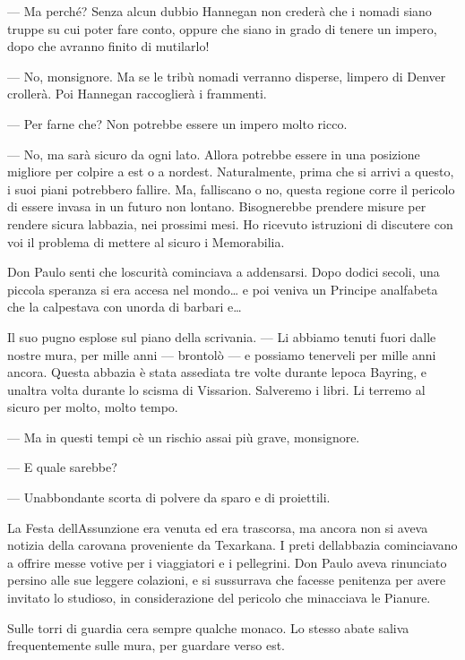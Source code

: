 --- Ma perché? Senza alcun dubbio Hannegan non crederà che i nomadi
siano truppe su cui poter fare conto, oppure che siano in grado di
tenere un impero, dopo che avranno finito di mutilarlo!

--- No, monsignore. Ma se le tribù nomadi verranno disperse,
l\textquotesingle impero di Denver crollerà. Poi Hannegan raccoglierà i
frammenti.

--- Per farne che? Non potrebbe essere un impero molto ricco.

--- No, ma sarà sicuro da ogni lato. Allora potrebbe essere in una
posizione migliore per colpire a est o a nordest. Naturalmente, prima
che si arrivi a questo, i suoi piani potrebbero fallire. Ma, falliscano
o no, questa regione corre il pericolo di essere invasa in un futuro non
lontano. Bisognerebbe prendere misure per rendere sicura
l\textquotesingle abbazia, nei prossimi mesi. Ho ricevuto istruzioni di
discutere con voi il problema di mettere al sicuro i Memorabilia.

Don Paulo senti che l\textquotesingle oscurità cominciava a addensarsi.
Dopo dodici secoli, una piccola speranza si era accesa nel mondo\ldots{}
e poi veniva un Principe analfabeta che la calpestava con
un\textquotesingle orda di barbari e\ldots{}

Il suo pugno esplose sul piano della scrivania. --- Li abbiamo tenuti
fuori dalle nostre mura, per mille anni --- brontolò --- e possiamo
tenerveli per mille anni ancora. Questa abbazia è stata assediata tre
volte durante l\textquotesingle epoca Bayring, e
un\textquotesingle altra volta durante lo scisma di Vissarion. Salveremo
i libri. Li terremo al sicuro per molto, molto tempo.

--- Ma in questi tempi c\textquotesingle è un rischio assai più grave,
monsignore.

--- E quale sarebbe?

--- Un\textquotesingle abbondante scorta di polvere da sparo e di
proiettili.

La Festa dell\textquotesingle Assunzione era venuta ed era trascorsa, ma
ancora non si aveva notizia della carovana proveniente da Texarkana. I
preti dell\textquotesingle abbazia cominciavano a offrire messe votive
per i viaggiatori e i pellegrini. Don Paulo aveva rinunciato persino
alle sue leggere colazioni, e si sussurrava che facesse penitenza per
avere invitato lo studioso, in considerazione del pericolo che
minacciava le Pianure.

Sulle torri di guardia c\textquotesingle era sempre qualche monaco. Lo
stesso abate saliva frequentemente sulle mura, per guardare verso est.

